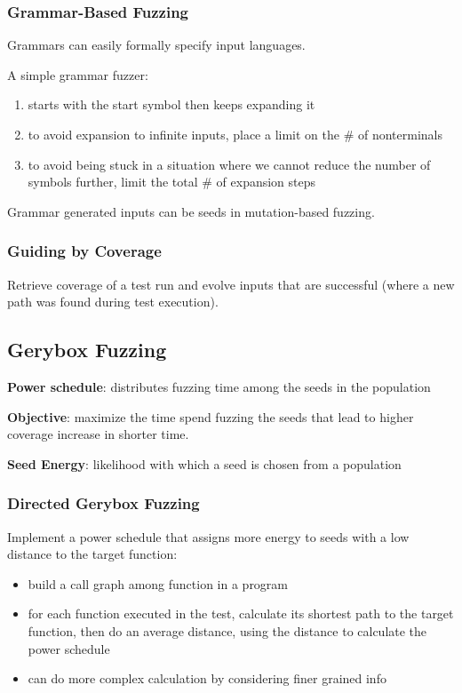 \documentclass[11pt]{article}
\begin{document}
\subsubsection{Grammar-Based Fuzzing}
\label{sec:orged0b1a2}
Grammars can easily formally specify input languages.

A simple grammar fuzzer:
\begin{enumerate}
\item starts with the start symbol then keeps expanding it
\item to avoid expansion to infinite inputs, place a limit on the \# of nonterminals
\item to avoid being stuck in a situation where we cannot reduce the number of symbols
further, limit the total \# of expansion steps
\end{enumerate}

Grammar generated inputs can be seeds in mutation-based fuzzing.
\subsubsection{Guiding by Coverage}
\label{sec:org6cdb748}
Retrieve coverage of a test run and evolve inputs that are successful (where a new
path was found during test execution).
\subsection{Gerybox Fuzzing}
\label{sec:org79573f5}
\textbf{Power schedule}: distributes fuzzing time among the seeds in the population

\textbf{Objective}: maximize the time spend fuzzing the seeds that lead to higher coverage
increase in shorter time.

\textbf{Seed Energy}: likelihood with which a seed is chosen from a population
\subsubsection{Directed Gerybox Fuzzing}
\label{sec:org81f13aa}
Implement a power schedule that assigns more energy to seeds with a low distance
to the target function:
\begin{itemize}
\item build a call graph among function in a program
\item for each function executed in the test, calculate its shortest path to the
target function, then do an average distance, using the distance to calculate
the power schedule
\item can do more complex calculation by considering finer grained info
\end{itemize}
\end{document}
